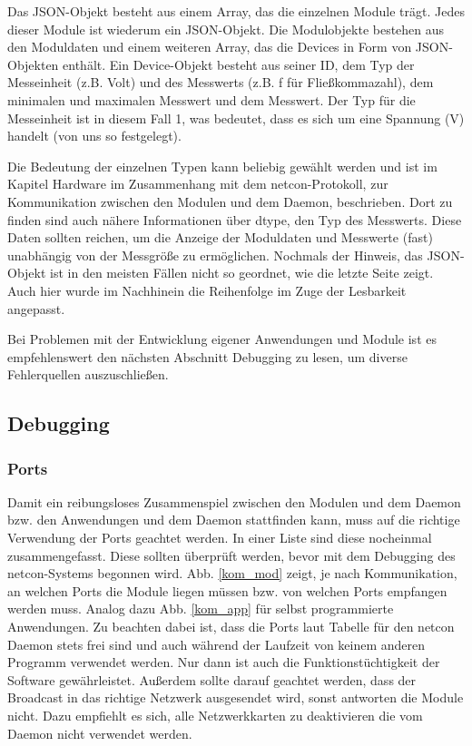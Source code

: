 \documentclass[a4paper,14pt,headsepline]{scrartcl}
\begin{document}
\newpage

Das JSON-Objekt besteht aus einem Array, das die einzelnen Module trägt. Jedes dieser Module ist wiederum ein JSON-Objekt. Die Modulobjekte bestehen aus den Moduldaten und einem weiteren Array, das die Devices in Form von JSON-Objekten enthält. Ein Device-Objekt besteht aus seiner ID, dem Typ der Messeinheit (z.B. Volt) und des Messwerts (z.B. f für Fließkommazahl), dem minimalen und maximalen Messwert und dem Messwert. Der Typ für die Messeinheit ist in diesem Fall 1, was bedeutet, dass es sich um eine Spannung (V) handelt (von uns so festgelegt). 

Die Bedeutung der einzelnen Typen kann beliebig gewählt werden und ist im Kapitel Hardware im Zusammenhang mit dem netcon-Protokoll, zur Kommunikation zwischen den Modulen und dem Daemon, beschrieben. Dort zu finden sind auch nähere Informationen über dtype, den Typ des Messwerts. Diese Daten sollten reichen, um die Anzeige der Moduldaten und Messwerte (fast) unabhängig von der Messgröße zu ermöglichen. Nochmals der Hinweis, das JSON-Objekt ist in den meisten Fällen nicht so geordnet, wie die letzte Seite zeigt. Auch hier wurde im Nachhinein die Reihenfolge im Zuge der Lesbarkeit angepasst. 

Bei Problemen mit der Entwicklung eigener Anwendungen und Module ist es empfehlenswert den nächsten Abschnitt Debugging zu lesen, um diverse Fehlerquellen auszuschließen. 

\newpage

\subsection{Debugging}

\subsubsection{Ports}

Damit ein reibungsloses Zusammenspiel zwischen den Modulen und dem Daemon bzw. den Anwendungen und dem Daemon stattfinden kann, muss auf die richtige Verwendung der Ports geachtet werden. In einer Liste sind diese nocheinmal zusammengefasst. Diese sollten überprüft werden, bevor mit dem Debugging des netcon-Systems begonnen wird. Abb. \ref{kom_mod} zeigt, je nach Kommunikation, an welchen Ports die Module liegen müssen bzw. von welchen Ports empfangen werden muss. Analog dazu Abb. \ref{kom_app} für selbst programmierte Anwendungen. Zu beachten dabei ist, dass die Ports laut Tabelle für den netcon Daemon stets frei sind und auch während der Laufzeit von keinem anderen Programm verwendet werden. Nur dann ist auch die Funktionstüchtigkeit der Software gewährleistet. Außerdem sollte darauf geachtet werden, dass der Broadcast in das richtige Netzwerk ausgesendet wird, sonst antworten die Module nicht. Dazu empfiehlt es sich, alle Netzwerkkarten zu deaktivieren die vom Daemon nicht verwendet werden. 
\end{document}
